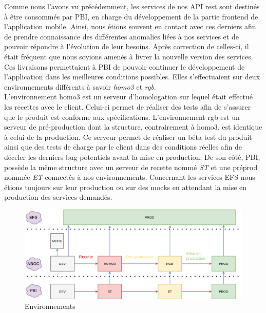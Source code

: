 	Comme nous l'avons vu précédemment, les services de nos API rest sont destinés à être consommés par PBI, en charge du développement de la partie frontend de l'application mobile. Ainsi, nous étions souvent en contact avec ces derniers afin de prendre connaissance des différentes anomalies liées à nos services et de pouvoir répondre à l'évolution de leur besoins. Après correction de celles-ci, il était fréquent que nous soyions amenés à livrer la nouvelle version des services. Ces livraisons permettaient à PBI de pouvoir continuer le développement de l'application dans les meilleures conditions possibles. Elles s'effectuaient sur deux environnements différents à savoir \textit{homo3} et \textit{rgb}. \\
	
	L'environnement homo3 est un serveur d'homologation sur lequel était effectué les recettes avec le client. Celui-ci permet de réaliser des tests afin de s'assurer que le produit est conforme aux spécifications. L'environnement rgb est un serveur de pré-production dont la structure, contrairement à homo3, est identique à celui de la production. Ce serveur permet de réaliser un béta test du produit ainsi que des tests de charge par le client dans des conditions réelles afin de déceler les derniers bug potentiels avant la mise en production. De son côté, PBI, possède la même structure avec un serveur de recette nommé \textit{ST} et une préprod nommée \textit{ET} connectés à nos environnements. Concernant les services EFS nous étions toujours sur leur production ou sur des mocks en attendant la mise en production des services demandés.\\
	
\begin{figure}[H]
	\includegraphics[scale=0.5]{images/travailNeuflizeOBC/architecture/environnement.png}
	\centering
	\caption{Environnements}
	\label{environnement}
\end{figure}
	
